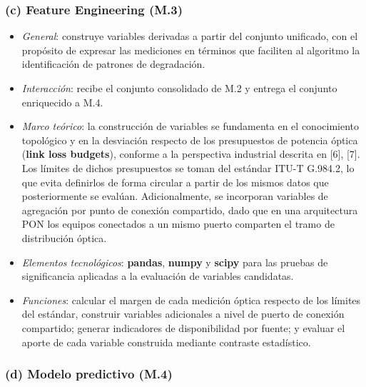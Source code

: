 \documentclass[12pt,a4paper]{article}
\begin{document}
\subsubsection*{(c) Feature Engineering (M.3)}
 
\begin{itemize}
    \item \textit{General}: construye variables derivadas a partir del conjunto unificado, con el propósito de expresar las mediciones en términos que faciliten al algoritmo la identificación de patrones de degradación.
    \item \textit{Interacción}: recibe el conjunto consolidado de M.2 y entrega el conjunto enriquecido a M.4.
    \item \textit{Marco teórico}: la construcción de variables se fundamenta en el conocimiento topológico y en la desviación respecto de los presupuestos de potencia óptica (\textbf{link loss budgets}), conforme a la perspectiva industrial descrita en [6], [7]. Los límites de dichos presupuestos se toman del estándar ITU-T G.984.2, lo que evita definirlos de forma circular a partir de los mismos datos que posteriormente se evalúan. Adicionalmente, se incorporan variables de agregación por punto de conexión compartido, dado que en una arquitectura PON los equipos conectados a un mismo puerto comparten el tramo de distribución óptica.
    \item \textit{Elementos tecnológicos}: \textbf{pandas}, \textbf{numpy} y \textbf{scipy} para las pruebas de significancia aplicadas a la evaluación de variables candidatas.
    \item \textit{Funciones}: calcular el margen de cada medición óptica respecto de los límites del estándar, construir variables adicionales a nivel de puerto de conexión compartido; generar indicadores de disponibilidad por fuente; y evaluar el aporte de cada variable construida mediante contraste estadístico.
\end{itemize}

\subsubsection*{(d) Modelo predictivo (M.4)}
 
\end{document}
